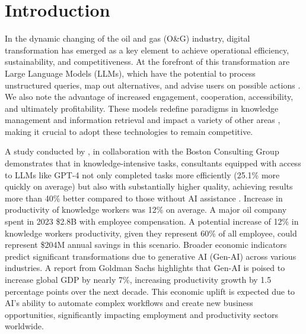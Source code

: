 
\chapter{Introduction}




    In the dynamic changing of the oil and gas (O\&G) industry, 
    digital transformation has emerged as a key element to achieve operational efficiency, sustainability, and competitiveness. 
    At the forefront of this transformation are Large Language Models (LLMs), which have the potential to process unstructured queries, map out alternatives, and advise users on possible actions \cite{Kar2023}. 
    We also note the advantage of increased engagement, cooperation, accessibility, and ultimately profitability. 
    These models redefine paradigms in knowledge management and information retrieval and impact a variety of other areas \cite{Eckroth2023}, making it crucial to adopt these technologies to remain competitive.    
    
    A study conducted by \cite{Dellacqua2023}, in collaboration with the Boston Consulting Group demonstrates that in knowledge-intensive tasks, consultants equipped with access to LLMs like GPT-4 not only completed tasks more efficiently (25.1\% more quickly on average) but also with substantially higher quality, achieving results more than 40\% better compared to those without AI assistance \cite{Dellacqua2023}. Increase in productivity of knowledge workers was 12\% on average.    
    A major oil company spent in 2023 \$2.8B with employee compensation. A potential increase of 12\% in knowledge workers productivity, given they represent 60\% of all employee, could represent \$204M annual savings in this scenario.     
    Broader economic indicators predict significant transformations due to generative AI (Gen-AI) across various industries.
    A report from Goldman Sachs \cite{Hatzius2023} highlights that Gen-AI is poised to increase global GDP by nearly 7\%, increasing productivity growth by 1.5 percentage points over the next decade. 
    This economic uplift is expected due to AI's ability to automate complex workflows and create new business opportunities, significantly impacting employment and productivity sectors worldwide.
            
